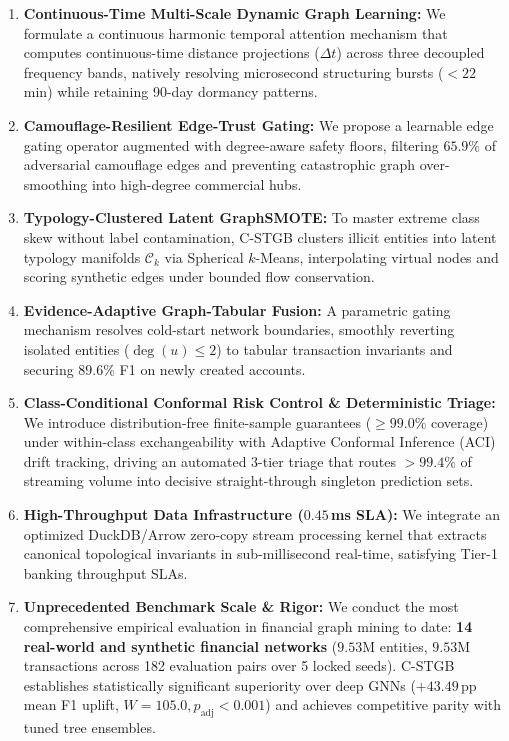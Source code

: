 \documentclass[9.3pt,a4paper]{article}
\begin{document}
\begin{enumerate}[label=\textbf{\arabic*.}]
    \item \textbf{Continuous-Time Multi-Scale Dynamic Graph Learning:} We formulate a continuous harmonic temporal attention mechanism that computes continuous-time distance projections ($\Delta t$) across three decoupled frequency bands, natively resolving microsecond structuring bursts ($< 22$\,min) while retaining 90-day dormancy patterns.
    \item \textbf{Camouflage-Resilient Edge-Trust Gating:} We propose a learnable edge gating operator augmented with degree-aware safety floors, filtering $65.9\%$ of adversarial camouflage edges and preventing catastrophic graph over-smoothing into high-degree commercial hubs.
    \item \textbf{Typology-Clustered Latent GraphSMOTE:} To master extreme class skew without label contamination, C-STGB clusters illicit entities into latent typology manifolds $\mathcal{C}_k$ via Spherical $k$-Means, interpolating virtual nodes and scoring synthetic edges under bounded flow conservation.
    \item \textbf{Evidence-Adaptive Graph-Tabular Fusion:} A parametric gating mechanism resolves cold-start network boundaries, smoothly reverting isolated entities ($\deg(u) \le 2$) to tabular transaction invariants and securing $89.6\%$ F1 on newly created accounts.
    \item \textbf{Class-Conditional Conformal Risk Control \& Deterministic Triage:} We introduce distribution-free finite-sample guarantees ($\ge 99.0\%$ coverage) under within-class exchangeability with Adaptive Conformal Inference (ACI) drift tracking, driving an automated 3-tier triage that routes $>99.4\%$ of streaming volume into decisive straight-through singleton prediction sets.
    \item \textbf{High-Throughput Data Infrastructure ($0.45$\,ms SLA):} We integrate an optimized DuckDB/Arrow zero-copy stream processing kernel that extracts canonical topological invariants in sub-millisecond real-time, satisfying Tier-1 banking throughput SLAs.
    \item \textbf{Unprecedented Benchmark Scale \& Rigor:} We conduct the most comprehensive empirical evaluation in financial graph mining to date: \textbf{14 real-world and synthetic financial networks} ($9.53\text{M}$ entities, $9.53\text{M}$ transactions across 182 evaluation pairs over 5 locked seeds). C-STGB establishes statistically significant superiority over deep GNNs ($+43.49$\,pp mean F1 uplift, $W=105.0, p_{\text{adj}} < 0.001$) and achieves competitive parity with tuned tree ensembles.
\end{enumerate}
\end{document}
